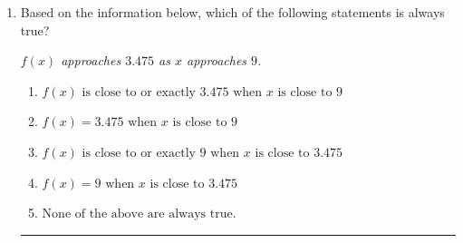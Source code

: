 \documentclass[14pt]{extbook}
\newcommand{\litem}[1]{\item#1\hspace*{-1cm}\rule{\textwidth}{0.4pt}}
\begin{document}
\begin{enumerate}
{\begin{enumerate}[label=\Alph*.]
\end{enumerate} }
\litem{
Based on the information below, which of the following statements is always true?
\begin{center}
    \textit{ $f(x)$ approaches $3.475$ as $x$ approaches $9$. }
\end{center}
\begin{enumerate}[label=\Alph*.]
\item \( f(x) \text{ is close to or exactly } 3.475 \text{ when } x \text{ is close to } 9 \)
\item \( f(x) = 3.475 \text{ when } x \text{ is close to } 9 \)
\item \( f(x) \text{ is close to or exactly } 9 \text{ when } x \text{ is close to } 3.475 \)
\item \( f(x) = 9 \text{ when } x \text{ is close to } 3.475 \)
\item \( \text{None of the above are always true.} \)

\end{enumerate} }
\end{enumerate}
\end{document}
